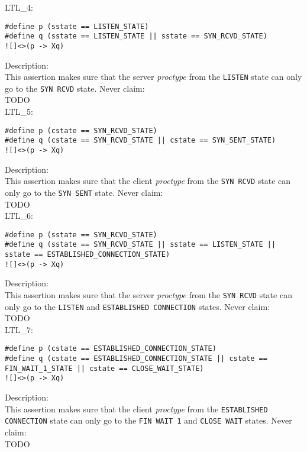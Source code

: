 \documentclass{WigReport}
\begin{document}
LTL\_4:\\
\begin{verbatim}
#define p (sstate == LISTEN_STATE)
#define q (sstate == LISTEN_STATE || sstate == SYN_RCVD_STATE)
![]<>(p -> Xq)
\end{verbatim}
Description:\\
This assertion makes sure that the server \textit{proctype} from the \verb|LISTEN| state can only go to the \verb|SYN RCVD| state.
Never claim:\\
TODO\\

LTL\_5:\\
\begin{verbatim}
#define p (cstate == SYN_RCVD_STATE)
#define q (cstate == SYN_RCVD_STATE || cstate == SYN_SENT_STATE)
![]<>(p -> Xq)
\end{verbatim}
Description:\\
This assertion makes sure that the client \textit{proctype} from the \verb|SYN RCVD| state can only go to the \verb|SYN SENT| state.
Never claim:\\
TODO\\

LTL\_6:\\
\begin{verbatim}
#define p (sstate == SYN_RCVD_STATE)
#define q (sstate == SYN_RCVD_STATE || sstate == LISTEN_STATE || sstate == ESTABLISHED_CONNECTION_STATE)
![]<>(p -> Xq)
\end{verbatim}
Description:\\
This assertion makes sure that the server \textit{proctype} from the \verb|SYN RCVD| state can only go to the \verb|LISTEN| and \verb|ESTABLISHED CONNECTION| states.
Never claim:\\
TODO\\

LTL\_7:\\
\begin{verbatim}
#define p (cstate == ESTABLISHED_CONNECTION_STATE)
#define q (cstate == ESTABLISHED_CONNECTION_STATE || cstate == FIN_WAIT_1_STATE || cstate == CLOSE_WAIT_STATE)
![]<>(p -> Xq)
\end{verbatim}
Description:\\
This assertion makes sure that the client \textit{proctype} from the \verb|ESTABLISHED CONNECTION| state can only go to the \verb|FIN WAIT 1| and \verb|CLOSE WAIT| states.
Never claim:\\
TODO\\
\end{document}
